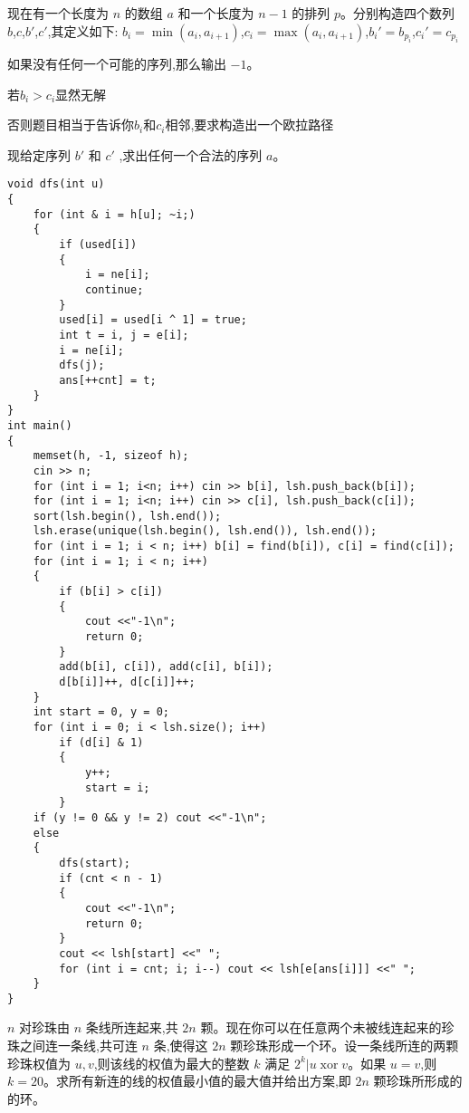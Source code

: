 \documentclass[a4paper, fontset=none]{ctexart}
\begin{document}
现在有一个长度为 $n$ 的数组 $a$ 和一个长度为 $n−1$ 的排列 $p$。分别构造四个数列 $b$,$c$,$b'$,$c'$,其定义如下:
$b_i=\min(a_i, a_{i+1})$,$c_i=\max(a_i, a_{i+1})$,$b_i'=b_{p_i}$,$c_i'=c_{p_i}$

如果没有任何一个可能的序列,那么输出 $-1$。

若$b_i > c_i$显然无解

否则题目相当于告诉你$b_i$和$c_i$相邻,要求构造出一个欧拉路径

现给定序列 $b'$ 和 $ c'$ ,求出任何一个合法的序列 $a$。

\begin{verbatim}
void dfs(int u)
{
    for (int & i = h[u]; ~i;)
    {
        if (used[i])
        {
            i = ne[i];
            continue;
        }
        used[i] = used[i ^ 1] = true;
        int t = i, j = e[i];
        i = ne[i];
        dfs(j);
        ans[++cnt] = t;
    }
}
int main()
{
    memset(h, -1, sizeof h);
    cin >> n;
    for (int i = 1; i<n; i++) cin >> b[i], lsh.push_back(b[i]);
    for (int i = 1; i<n; i++) cin >> c[i], lsh.push_back(c[i]);
    sort(lsh.begin(), lsh.end());
    lsh.erase(unique(lsh.begin(), lsh.end()), lsh.end());
    for (int i = 1; i < n; i++) b[i] = find(b[i]), c[i] = find(c[i]);
    for (int i = 1; i < n; i++)
    {
        if (b[i] > c[i])
        {
            cout <<"-1\n";
            return 0;
        }
        add(b[i], c[i]), add(c[i], b[i]);
        d[b[i]]++, d[c[i]]++;
    }
    int start = 0, y = 0;
    for (int i = 0; i < lsh.size(); i++)
        if (d[i] & 1)
        {
            y++;
            start = i;
        }
    if (y != 0 && y != 2) cout <<"-1\n";
    else
    {
        dfs(start);
        if (cnt < n - 1)
        {
            cout <<"-1\n";
            return 0;
        }
        cout << lsh[start] <<" ";
        for (int i = cnt; i; i--) cout << lsh[e[ans[i]]] <<" ";
    }
}
\end{verbatim}

$n$ 对珍珠由 $n$ 条线所连起来,共 $2n$ 颗。现在你可以在任意两个未被线连起来的珍珠之间连一条线,共可连 $n$ 条,使得这 $2n$ 颗珍珠形成一个环。设一条线所连的两颗珍珠权值为 $u, v$,则该线的权值为最大的整数 $k$ 满足 $2 ^ k | u \operatorname{xor} v$。如果 $u=v$,则 $k=20$。求所有新连的线的权值最小值的最大值并给出方案,即 $2n$ 颗珍珠所形成的的环。
\end{document}
